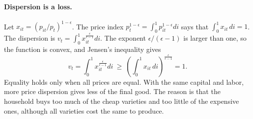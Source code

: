 \documentclass[11pt]{article}
\begin{document}
\paragraph{Dispersion is a loss.} Let $x_{it} = (p_{it}/p_t)^{1-\epsilon}$. The price index $p_t^{1-\epsilon} = \int_0^1 p_{it}^{1-\epsilon} di$ says that $\int_0^1 x_{it}\, di = 1$. The dispersion is $v_t = \int_0^1 x_{it}^{\frac{\epsilon}{\epsilon-1}} di$. The exponent $\epsilon/(\epsilon-1)$ is larger than one, so the function is convex, and Jensen's inequality gives
\begin{equation*}
v_t = \int_0^1 x_{it}^{\frac{\epsilon}{\epsilon-1}} di \ \ge \ \left( \int_0^1 x_{it}\, di \right)^{\frac{\epsilon}{\epsilon-1}} = 1 .
\end{equation*}
Equality holds only when all prices are equal. With the same capital and labor, more price dispersion gives less of the final good. The reason is that the household buys too much of the cheap varieties and too little of the expensive ones, although all varieties cost the same to produce.
\end{document}
